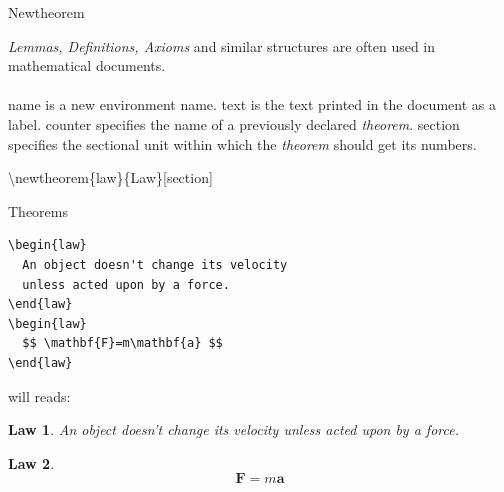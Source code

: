 \documentclass[10pt,t]{beamer}
\begin{document}
\begin{frame}{Newtheorem}

{\em Lemmas, Definitions, Axioms} and similar structures are often used
    in mathematical documents.\\[3ex]

    \\[3ex]

\alert{name} is a new environment name. \alert{text} is the text
printed in the document as a label. \alert{counter} specifies the
name of a previously declared {\em theorem}. \alert{section} specifies
the sectional unit within which the {\em theorem} should get its numbers.

    \begin{example}
        \textbackslash newtheorem\{law\}\{Law\}[section]
    \end{example}

\end{frame}

\begin{frame}[fragile]{Theorems}
\newtheorem{law}{Law}[section]

\begin{lstlisting}[language={[LaTeX]TeX},keywordstyle=\color{red}]
\begin{law}
  An object doesn't change its velocity
  unless acted upon by a force.
\end{law}
\begin{law}
  $$ \mathbf{F}=m\mathbf{a} $$
\end{law}
\end{lstlisting}

will reads:

\begin{law}
  An object doesn't change its velocity unless acted upon by a force.
\end{law}
\begin{law}
  $$ \mathbf{F}=m\mathbf{a} $$
\end{law}

\end{frame}
\end{document}
